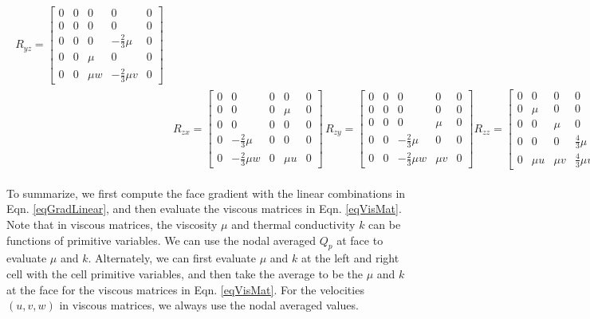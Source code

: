 \documentclass[12pt, letterpaper]{report}
\begin{document}
\begin{align}
\begin{split}
      R_{yz} = \begin{bmatrix}
         0 & 0 & 0 & 0 & 0 \\
         0 & 0 & 0 & 0 & 0 \\
         0 & 0 & 0 & -\frac{2}{3}\mu & 0 \\
         0 & 0 & \mu & 0 & 0 \\
         0 & 0 & \mu w & -\frac{2}{3}\mu v& 0
      \end{bmatrix}\\[10pt]
      &R_{zx} = \begin{bmatrix}
         0 & 0 & 0 & 0 & 0 \\
         0 & 0 & 0 & \mu & 0 \\
         0 & 0 & 0 & 0 & 0 \\
         0 & -\frac{2}{3}\mu & 0 & 0 & 0 \\
         0 & -\frac{2}{3}\mu w & 0 & \mu u & 0
      \end{bmatrix} \,
      R_{zy} = \begin{bmatrix}
         0 & 0 & 0 & 0 & 0 \\
         0 & 0 & 0 & 0 & 0 \\
         0 & 0 & 0 & \mu & 0 \\
         0 & 0 & -\frac{2}{3}\mu & 0 & 0 \\
         0 & 0 & -\frac{2}{3}\mu w & \mu v & 0
      \end{bmatrix}
      R_{zz} = \begin{bmatrix}
         0 & 0 & 0 & 0 & 0 \\
         0 & \mu & 0 & 0 & 0 \\
         0 & 0 & \mu & 0 & 0 \\
         0 & 0 & 0 & \frac{4}{3}\mu & 0 \\
         0 & \mu u & \mu v & \frac{4}{3}\mu w & k
      \end{bmatrix}
   \end{split}
\end{align}

To summarize, we first compute the face gradient with the linear combinations in Eqn.
\ref{eqGradLinear}, and then evaluate the viscous matrices in Eqn. \ref{eqVisMat}. Note that in
viscous matrices, the viscosity $\mu$ and thermal conductivity $k$ can be functions of primitive
variables. We can use the nodal averaged $Q_p$ at face to evaluate $\mu$ and $k$. Alternately, we
can first evaluate $\mu$ and $k$ at the left and right cell with the cell primitive variables, and
then take the average to be the $\mu$ and $k$ at the face for the viscous matrices in Eqn.
\ref{eqVisMat}. For the velocities $(u, v, w)$ in viscous matrices, we always use the nodal averaged
values.
\end{document}

